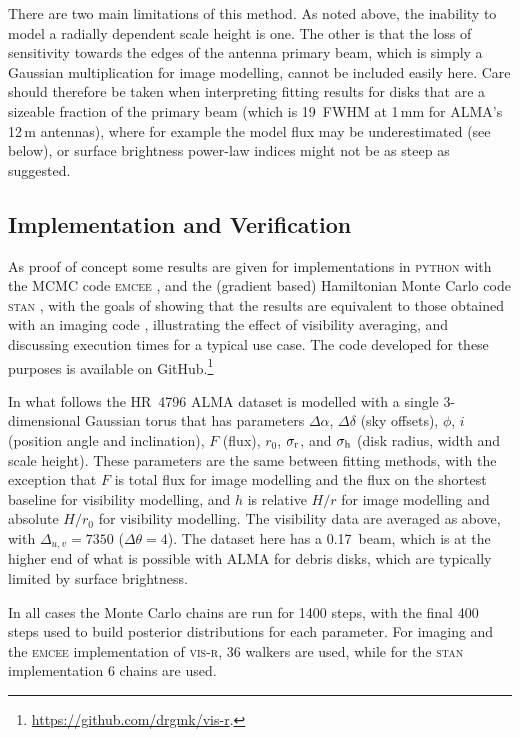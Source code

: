 \documentclass[fleqn,usenatbib]{rasti}
\begin{document}
There are two main limitations of this method. As noted above, the inability to model a radially dependent scale height is one. The other is that the loss of sensitivity towards the edges of the antenna primary beam, which is simply a Gaussian multiplication for image modelling, cannot be included easily here. Care should therefore be taken when interpreting fitting results for disks that are a sizeable fraction of the primary beam (which is 19\arcsec~FWHM at 1\,mm for ALMA's 12\,m antennas), where for example the model flux may be underestimated (see below), or surface brightness power-law indices might not be as steep as suggested.

\subsection{ Implementation and Verification}

As proof of concept some results are given for implementations in \textsc{python} with the MCMC code \textsc{emcee} \citep{2013PASP..125..306F}, and the (gradient based) Hamiltonian Monte Carlo code \textsc{stan} \citep{2017JSS....76....1C}, with the goals of showing that the results are equivalent to those obtained with an imaging code \citep[e.g.][]{2021MNRAS.504.4497C}, illustrating the effect of visibility averaging, and discussing execution times for a typical use case. The code developed for these purposes is available on GitHub.\footnote{\href{https://github.com/drgmk/vis-r}{https://github.com/drgmk/vis-r}.}

In what follows the HR~4796 ALMA dataset is modelled with a single 3-dimensional Gaussian torus that has parameters $\Delta \alpha$, $\Delta \delta$ (sky offsets), $\phi$, $i$ (position angle and inclination), $F$ (flux), $r_0$, $\sigma_{\rm r}$, and $\sigma_{\rm h}$ (disk radius, width and scale height). These parameters are the same between fitting methods, with the exception that $F$ is total flux for image modelling and the flux on the shortest baseline for visibility modelling, and $h$ is relative $H/r$ for image modelling and absolute $H/r_0$ for visibility modelling. The visibility data are averaged as above, with $\Delta_{u,v} = 7350$ ($\Delta \theta = 4$). The dataset here has a 0.17\arcsec~beam, which is at the higher end of what is possible with ALMA for debris disks, which are typically limited by surface brightness.

In all cases the Monte Carlo chains are run for 1400 steps, with the final 400 steps used to build posterior distributions for each parameter. For imaging and the \textsc{emcee} implementation of \textsc{vis-r}, 36 walkers are used, while for the \textsc{stan} implementation 6 chains are used.
\end{document}
